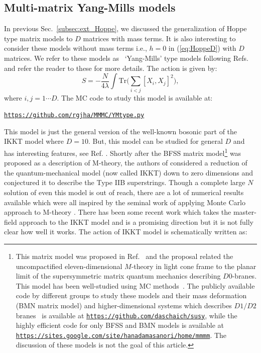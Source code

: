 \documentclass[letter,11pt]{article}
\begin{document}
\subsection{Multi-matrix Yang-Mills models}
In previous Sec.~\ref{subsec:ext_Hoppe}, we discussed the generalization of Hoppe type matrix models to $D$ matrices with mass terms. It is also interesting to consider these models without mass terms i.e., $h=0$ in (\ref{eq:HoppeD}) with $D$ matrices. We refer to these models as ~`Yang-Mills' type models following Refs.~\cite{Krauth:1998yu,Krauth:1999qw} and refer the reader to these for more details. The action is given by: 
\begin{equation}
	\label{eq:CTmodel} 
S = -\frac{N}{4\lambda} \int \mbox{Tr} \Bigg( \sum_{i < j}[X_i, X_j]^{2}\Bigg), 
\end{equation}
where $i, j = 1 \cdots D$. The MC code to study this model is available at:
\begin{center} \texttt{\href{https://github.com/rgjha/MMMC/blob/main/YMtype.py}{https://github.com/rgjha/MMMC/YMtype.py}} \end{center}
This model is just the general version of the well-known bosonic part of the IKKT model where $D=10$. But, this model can be studied for general $D$ and has interesting features, see Ref. \cite{Hotta:1998en}. 
Shortly after the BFSS matrix model\footnote{This matrix model was proposed in Ref.~\cite{Banks:1996vh} and the proposal related the uncompactified eleven-dimensional $M$-theory in light cone frame to the planar limit of the supersymmetric matrix quantum mechanics describing $D0$-branes. This model has been well-studied using MC methods~\cite{Catterall:2007fp,Hanada:2008ez,Filev:2015hia,Berkowitz:2016tyy}. 
The publicly available code by different groups 
to study these models and their mass deformation (BMN matrix model) and higher-dimensional systems which describes $D1/D2$ branes~\cite{Catterall:2017lub,Jha:2017zad,Catterall:2020nmn}
is available at \texttt{\href{https://github.com/daschaich/susy}{https://github.com/daschaich/susy}}, while the
highly efficient code for only BFSS and BMN models is available at
\texttt{\href{https://sites.google.com/site/hanadamasanori/home/mmmm}
{https://sites.google.com/site/hanadamasanori/home/mmmm}}.
The discussion of these models is not the goal of this article. 
}
was proposed as a description of M-theory, the authors of 
\cite{Ishibashi:1996xs} considered a reduction of the quantum-mechanical model (now called IKKT) down to zero 
dimensions and conjectured it to describe the Type IIB superstrings. Though a complete large $N$ solution of even this model is out of reach, there are a lot of numerical results available which were all inspired by the seminal work of applying Monte Carlo approach to M-theory \cite{Krauth:1998xh}. There has been some recent work which takes the master-field approach to the IKKT model \cite{Klinkhamer:2021wrv} and is a promising direction but it is not fully clear how well it works. The action of IKKT model is schematically written as:
\end{document}
